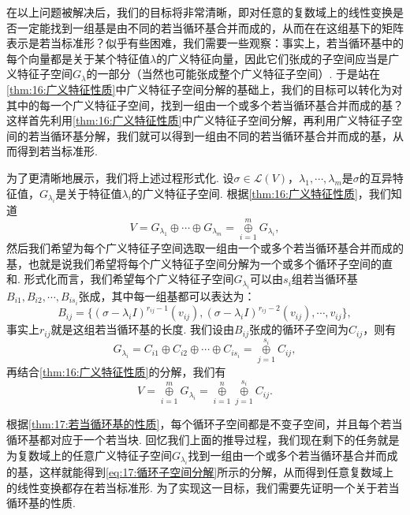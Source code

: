 在以上问题被解决后，我们的目标将非常清晰，即对任意的复数域上的线性变换是否一定能找到一组基是由不同的若当循环基合并而成的，从而在在这组基下的矩阵表示是若当标准形？似乎有些困难，我们需要一些观察：事实上，若当循环基中的每个向量都是关于某个特征值$\lambda$的广义特征向量，因此它们张成的子空间应当是广义特征子空间$G_\lambda$的一部分（当然也可能张成整个广义特征子空间）. 于是站在\autoref{thm:16:广义特征性质}中广义特征子空间分解的基础上，我们的目标可以转化为对其中的每一个广义特征子空间，找到一组由一个或多个若当循环基合并而成的基？这样首先利用\autoref{thm:16:广义特征性质}中广义特征子空间分解，再利用广义特征子空间的若当循环基分解，我们就可以得到一组由不同的若当循环基合并而成的基，从而得到若当标准形.

为了更清晰地展示，我们将上述过程形式化. 设$\sigma\in\mathcal{L}(V)$，$\lambda_1,\cdots,\lambda_m$是$\sigma$的互异特征值，$G_{\lambda_i}$是关于特征值$\lambda_i$的广义特征子空间. 根据\autoref{thm:16:广义特征性质}，我们知道
\[V=G_{\lambda_1}\oplus\cdots\oplus G_{\lambda_m}=\mathop{\oplus}\limits_{i=1}^m G_{\lambda_i},\]
然后我们希望为每个广义特征子空间选取一组由一个或多个若当循环基合并而成的基，也就是说我们希望将每个广义特征子空间分解为一个或多个循环子空间的直和. 形式化而言，我们希望每个广义特征子空间$G_{\lambda_i}$可以由$s_i$组若当循环基$B_{i1},B_{i2},\cdots,B_{is_i}$张成，其中每一组基都可以表达为：
\[B_{ij}=\{(\sigma-\lambda_iI)^{r_{ij}-1}(v_{ij}),(\sigma-\lambda_iI)^{r_{ij}-2}(v_{ij}),\cdots,v_{ij}\},\]
事实上$r_{ij}$就是这组若当循环基的长度. 我们设由$B_{ij}$张成的循环子空间为$C_{ij}$，则有
\[G_{\lambda_i}=C_{i1}\oplus C_{i2}\oplus\cdots\oplus C_{is_i}=\mathop{\oplus}\limits_{j=1}^{s_i} C_{ij},\]
再结合\autoref{thm:16:广义特征性质}的分解，我们有
\begin{equation} \label{eq:17:循环子空间分解}
    V=\mathop{\oplus}\limits_{i=1}^m G_{\lambda_i}=\mathop{\oplus}\limits_{i=1}^n\mathop{\oplus}\limits_{j=1}^{s_i} C_{ij}.
\end{equation}

根据\autoref{thm:17:若当循环基的性质}，每个循环子空间都是不变子空间，并且每个若当循环基都对应于一个若当块. 回忆我们上面的推导过程，我们现在剩下的任务就是为复数域上的任意广义特征子空间$G_{\lambda_i}$找到一组由一个或多个若当循环基合并而成的基，这样就能得到\autoref{eq:17:循环子空间分解}所示的分解，从而得到任意复数域上的线性变换都存在若当标准形. 为了实现这一目标，我们需要先证明一个关于若当循环基的性质.

